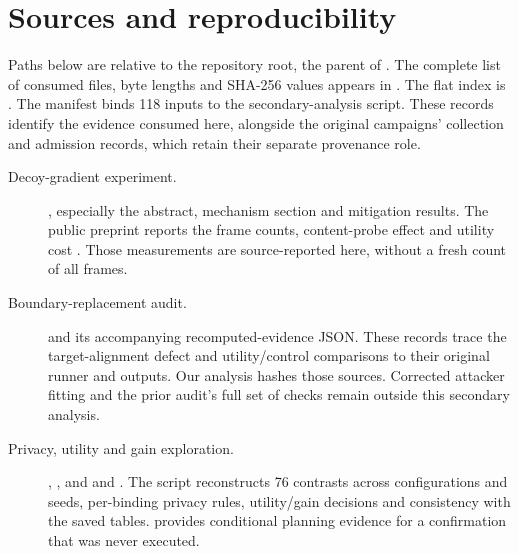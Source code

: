 \section{Sources and reproducibility}
\label{app:artifacts}

Paths below are relative to the repository root, the parent of
. The complete list of consumed files, byte lengths
and SHA-256 values appears in .
The flat index is . The manifest
binds 118 inputs to the secondary-analysis script. These records identify
the evidence consumed here, alongside the original campaigns' collection
and admission records, which retain their separate provenance role.

\begin{description}
\item[\hypertarget{artifact-E1}{Decoy-gradient experiment.}]
, especially the abstract,
mechanism section and mitigation results. The public preprint reports the
frame counts, content-probe effect and utility cost \citep{paper1}.
Those measurements are source-reported here, without a fresh count of
all frames.

\item[\hypertarget{artifact-B1}{Boundary-replacement audit.}]
and its accompanying recomputed-evidence JSON. These records trace the
target-alignment defect and utility/control comparisons to their original
runner and outputs. Our analysis hashes those sources. Corrected attacker
fitting and the prior audit's full set of checks remain outside this
secondary analysis.

\item[\hypertarget{artifact-R1}{Privacy, utility and gain exploration.}]
,
, and
 and
.
The script reconstructs 76 contrasts across configurations and seeds,
per-binding privacy rules, utility/gain decisions and consistency with
the saved tables.
provides conditional planning evidence for a confirmation that was never
executed.


\end{description}
